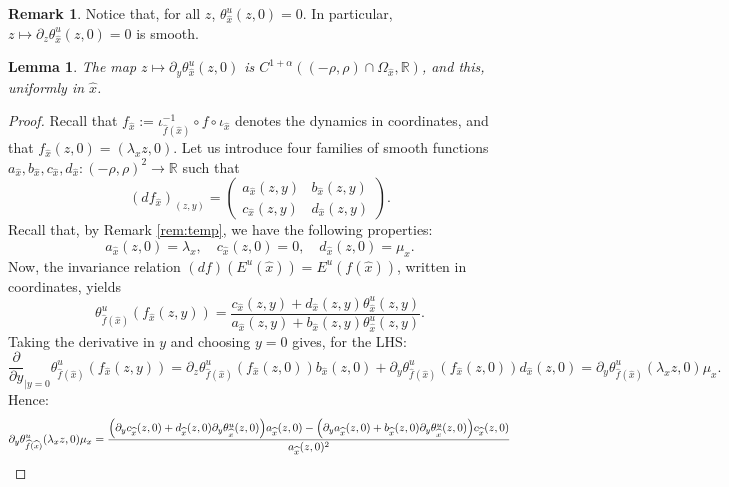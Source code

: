 \documentclass[a4paper]{article}
\newtheorem{lemma}[theorem]{Lemma}
\theoremstyle{definition}
\newtheorem{remark}[example]{Remark}
\begin{document}
\begin{remark}
Notice that, for all $z$, $\theta_{\widehat{x}}^u(z,0) = 0$. In particular, $z \mapsto \partial_z \theta_{\widehat{x}}^u(z,0)=0$ is smooth.
\end{remark}

\begin{lemma}
The map $z \mapsto \partial_y \theta_{\widehat{x}}^u(z,0)$ is $C^{1+\alpha}((-\rho,\rho) \cap \Omega_{\widehat{x}},\mathbb{R})$, and this, uniformly in ${\widehat{x}}$.
\end{lemma}

\begin{proof}
Recall that $f_{\widehat{x}} := \iota_{\widehat{f}({\widehat{x}})}^{-1} \circ f \circ \iota_{\widehat{x}}$ denotes the dynamics in coordinates, and that $f_{\widehat{x}}(z,0) = (\lambda_x z,0)$.
Let us introduce four families of smooth functions $a_{\widehat{x}},b_{\widehat{x}},c_{\widehat{x}},d_{\widehat{x}} : (-\rho,\rho)^2 \rightarrow \mathbb{R}$ such that $$ (df_{\widehat{x}})_{(z,y)} = \begin{pmatrix} a_{\widehat{x}}(z,y) & b_{\widehat{x}}(z,y) \\ c_{\widehat{x}}(z,y) & d_{\widehat{x}}(z,y) \end{pmatrix} . $$
Recall that, by Remark \ref{rem:temp}, we have the following properties:
$$ a_{\widehat{x}}(z,0) = \lambda_x, \quad c_{\widehat{x}}(z,0) = 0, \quad d_{\widehat{x}}(z,0) = \mu_x.$$
Now, the invariance relation $(df)(E^u({\widehat{x}})) = E^u(f({\widehat{x}}))$, written in coordinates, yields
$$ \theta^u_{\widehat{f}({\widehat{x}})}(f_{\widehat{x}}(z,y)) = \frac{c_{\widehat{x}}(z,y)+d_{\widehat{x}}(z,y) \theta_{\widehat{x}}^u(z,y)}{a_{\widehat{x}}(z,y)+b_{\widehat{x}}(z,y) \theta_{\widehat{x}}^u(z,y)} .$$
Taking the derivative in $y$ and choosing $y=0$ gives, for the LHS:
$$ \frac{\partial}{\partial y}_{|y=0}\theta^u_{\widehat{f}({\widehat{x}})}(f_{\widehat{x}}(z,y)) = \partial_z \theta_{\widehat{f}({\widehat{x}})}^u(f_{\widehat{x}}(z,0)) b_{\widehat{x}}(z,0) + \partial_y \theta_{\widehat{f}({\widehat{x}})}^u(f_{\widehat{x}}(z,0)) d_{\widehat{x}}(z,0) = \partial_y \theta_{\widehat{f}({\widehat{x}})}^u(\lambda_x z,0) \mu_x. $$
Hence:
$$\partial_y \theta_{\widehat{f}({\widehat{x}})}^u(\lambda_x z,0) \mu_x = \frac{\Big{(} \partial_y c_{\widehat{x}}(z,0) + d_{\widehat{x}}(z,0) \partial_y \theta_{\widehat{x}}^u(z,0) \Big{)} a_{\widehat{x}}(z,0) - \Big{(} \partial_y a_{\widehat{x}}(z,0) + b_{\widehat{x}}(z,0) \partial_y \theta_{\widehat{x}}^u(z,0) \Big{)} c_{\widehat{x}}(z,0)}{a_{\widehat{x}}(z,0)^2} $$

\end{proof}
\end{document}
